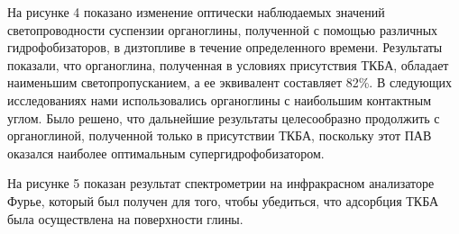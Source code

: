 \begin{multicols}{2}
На рисунке 4 показано изменение оптически наблюдаемых значений
светопроводности суспензии органоглины, полученной с помощью различных
гидрофобизаторов, в дизтопливе в течение определенного времени.
Результаты показали, что органоглина, полученная в условиях присутствия
ТКБА, обладает наименьшим светопропусканием, а ее эквивалент составляет
82\%. В следующих исследованиях нами использовались органоглины с
наибольшим контактным углом. Было решено, что дальнейшие результаты
целесообразно продолжить с органоглиной, полученной только в присутствии
ТКБА, поскольку этот ПАВ оказался наиболее оптимальным
супергидрофобизатором.

На рисунке 5 показан результат спектрометрии на инфракрасном анализаторе
Фурье, который был получен для того, чтобы убедиться, что адсорбция ТКБА
была осуществлена на поверхности глины.
\end{multicols}

